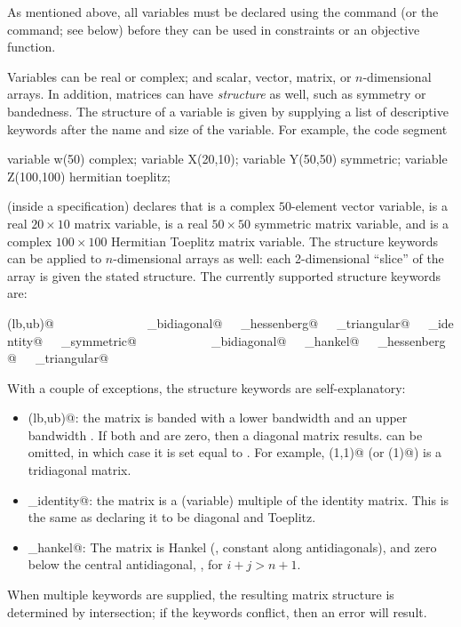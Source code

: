 \documentclass[12pt]{article}
\begin{document}
As mentioned above, all variables must be declared using the \verb@variable@
command (or the \verb@variables@ command; see below) before they can be
used in constraints or an objective function. 

Variables can be real or complex; and scalar, vector,
matrix, or $n$-dimensional arrays. In addition, matrices can have \emph{structure}
as well, such as symmetry or bandedness. The structure of a variable
is given by supplying a list of descriptive keywords after the name
and size of the variable.
For example, the code segment
\begin{code}
	variable w(50) complex;
	variable X(20,10);
	variable Y(50,50) symmetric;
	variable Z(100,100) hermitian toeplitz;
\end{code}
(inside a \cvx specification) declares that \verb@w@ is a complex
$50$-element vector variable, \verb@X@ is
a real $20 \times 10$ matrix variable, \verb@Y@ is
a real $50 \times 50$ symmetric matrix variable,
and \verb@Z@ is a complex $100 \times 100$ Hermitian Toeplitz 
matrix variable.
The structure keywords can be applied to
$n$-dimensional arrays as well:
each 2-dimensional ``slice'' of the array
is given the stated structure.  The currently supported structure
keywords are:
\begin{center}
\verb@banded(lb,ub)@\ \ \ \verb@complex@\ \ \ \verb@diagonal@\ \ \ \verb@hankel@\ \ \ \verb@hermitian@\ \ \ 
\verb@lower_bidiagonal@\ \ \ \verb@lower_hessenberg@\ \ \ \verb@lower_triangular@\ \ \ \verb@scaled_identity@\ \ \ 
\verb@skew_symmetric@\ \ \ \verb@symmetric@\ \ \ \verb@toeplitz@\ \ \ \verb@tridiagonal@\ \ \ 
\verb@upper_bidiagonal@\ \ \ \verb@upper_hankel@\ \ \ \verb@upper_hessenberg@\ \ \ \verb@upper_triangular@\ \ \ 
\end{center}
With a couple of exceptions, the structure keywords are self-explanatory:
\begin{itemize}
\item \verb@banded(lb,ub)@: the matrix is banded with a lower bandwidth \verb@lb@
and an upper bandwidth \verb@ub@. If both \verb@lb@ and \verb@ub@ are zero, then a 
diagonal matrix results. \verb@ub@ can be omitted, in which case it is set equal to \verb@lb@.
For example, \verb@banded(1,1)@ (or \verb@banded(1)@) is a tridiagonal matrix.
\item \verb@scaled_identity@: the matrix is a (variable) multiple of 
the identity matrix.
This is the same as declaring it to be diagonal and Toeplitz.
\item \verb@upper_hankel@: The matrix is Hankel (\ie, constant along antidiagonals), and zero
below the central antidiagonal, \ie, for $i+j>n+1$.
\end{itemize}
When multiple keywords are supplied, the resulting matrix structure is
determined by intersection; if the keywords conflict, then an error will result.
\end{document}
